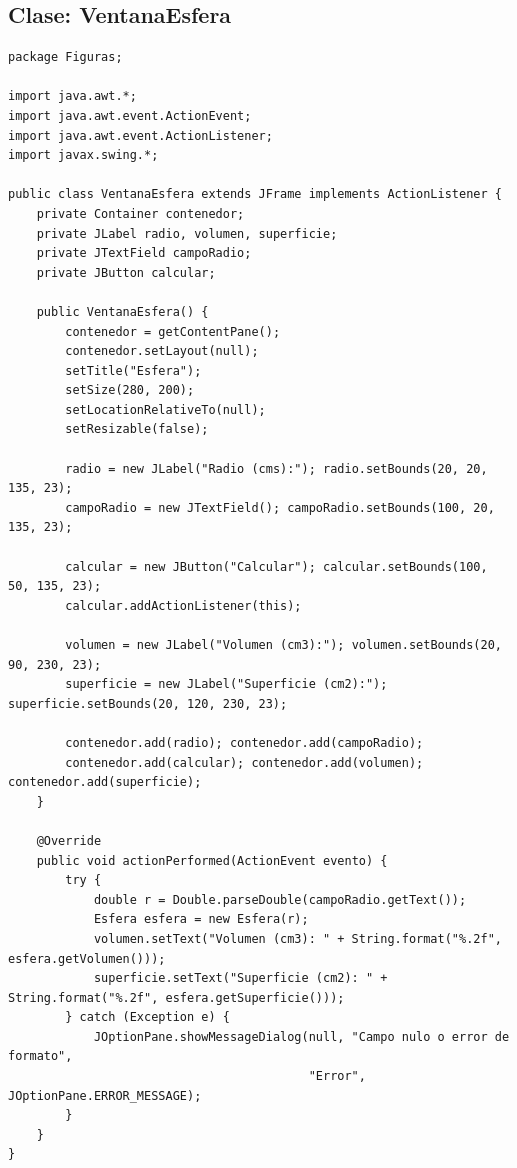 \documentclass[12pt,a4paper]{article}
\begin{document}
\subsection*{Clase: VentanaEsfera}
\begin{lstlisting}[caption={Clase VentanaEsfera.java}]
package Figuras;

import java.awt.*;
import java.awt.event.ActionEvent;
import java.awt.event.ActionListener;
import javax.swing.*;

public class VentanaEsfera extends JFrame implements ActionListener {
    private Container contenedor;
    private JLabel radio, volumen, superficie;
    private JTextField campoRadio;
    private JButton calcular;

    public VentanaEsfera() {
        contenedor = getContentPane();
        contenedor.setLayout(null);
        setTitle("Esfera");
        setSize(280, 200);
        setLocationRelativeTo(null);
        setResizable(false);

        radio = new JLabel("Radio (cms):"); radio.setBounds(20, 20, 135, 23);
        campoRadio = new JTextField(); campoRadio.setBounds(100, 20, 135, 23);

        calcular = new JButton("Calcular"); calcular.setBounds(100, 50, 135, 23);
        calcular.addActionListener(this);

        volumen = new JLabel("Volumen (cm3):"); volumen.setBounds(20, 90, 230, 23);
        superficie = new JLabel("Superficie (cm2):"); superficie.setBounds(20, 120, 230, 23);

        contenedor.add(radio); contenedor.add(campoRadio);
        contenedor.add(calcular); contenedor.add(volumen); contenedor.add(superficie);
    }

    @Override
    public void actionPerformed(ActionEvent evento) {
        try {
            double r = Double.parseDouble(campoRadio.getText());
            Esfera esfera = new Esfera(r);
            volumen.setText("Volumen (cm3): " + String.format("%.2f", esfera.getVolumen()));
            superficie.setText("Superficie (cm2): " + String.format("%.2f", esfera.getSuperficie()));
        } catch (Exception e) {
            JOptionPane.showMessageDialog(null, "Campo nulo o error de formato",
                                          "Error", JOptionPane.ERROR_MESSAGE);
        }
    }
}
\end{lstlisting}
\end{document}
